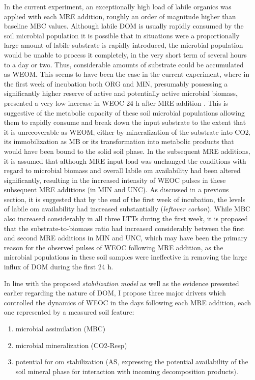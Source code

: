 	In the current experiment, an exceptionally high load of labile organics was applied with each MRE addition, roughly an order of magnitude higher than baseline MBC values.  Although labile DOM is usually rapidly consumed by the soil microbial population it is possible that in situations were a proportionally large amount of labile substrate is rapidly introduced, the microbial population would be unable to process it completely, in the very short term of several hours to a day or two. Thus, considerable amounts of substrate could be accumulated as WEOM. This seems to have been the case in the current experiment, where in the first week of incubation both ORG and MIN, presumably possessing a significantly higher reserve of active and potentially active microbial biomass, presented a very low increase in WEOC 24 h after MRE addition . This is suggestive of the metabolic capacity of these soil microbial populations allowing them to rapidly consume and break down the input substrate to the extent that it is unrecoverable as WEOM, either by mineralization of the substrate into CO2, its immobilization as MB or its transformation into metabolic products that would have been bound to the solid soil phase.
	 In the subsequent MRE additions, it is assumed that-although MRE input load was unchanged-the conditions with regard to microbial biomass and overall labile \gls{om} availability had been altered significantly, resulting in the increased intensity of WEOC pulses in these subsequent MRE additions (in MIN and UNC). As discussed in a previous section, it is suggested that by the end of the first week of incubation, the levels of labile \gls{om} availability had increased substantially (\textit{leftover carbon}). While MBC also increased  considerably in all three LTTs during the first week, it is proposed that the substrate-to-biomass  ratio had increased considerably between the first and second MRE additions in MIN and UNC, which may have been the primary reason for the observed pulses of WEOC following MRE addition, as the microbial populations in these soil samples were ineffective in removing the large influx of DOM during the first 24 h.

	In line with the proposed \textit{stabilization model} as well as the evidence presented earlier regarding the nature of DOM, I propose three  major drivers which controlled the dynamics of WEOC in the days following each MRE addition, each one represented by a measured soil feature:
	\begin{enumerate}
		\item microbial assimilation (MBC)
		\item microbial mineralization (CO2-Resp)
		\item potential for \gls{om} stabilization (AS, expressing the potential availability of the soil mineral phase for interaction with incoming decomposition products).
	\end{enumerate}



